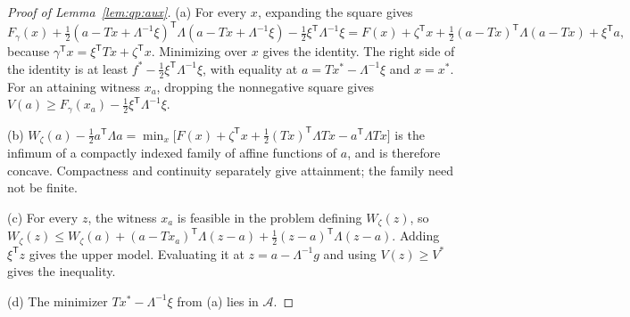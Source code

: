 \begin{proof}[Proof of Lemma~\ref{lem:qp:aux}]
(a) For every $x$, expanding the square gives
\[
 F_\gamma(x)+\tfrac12(a-Tx+\Lambda^{-1}\xi)^{\mathsf T}\Lambda(a-Tx+\Lambda^{-1}\xi)
 -\tfrac12\xi^{\mathsf T}\Lambda^{-1}\xi
 =F(x)+\zeta^{\mathsf T} x+\tfrac12(a-Tx)^{\mathsf T}\Lambda(a-Tx)+\xi^{\mathsf T} a ,
\]
because $\gamma^{\mathsf T} x=\xi^{\mathsf T} Tx+\zeta^{\mathsf T} x$. Minimizing over $x$ gives
the identity. The right side of the identity is at least
$f^*-\frac12\xi^{\mathsf T}\Lambda^{-1}\xi$, with equality at $a=Tx^*-\Lambda^{-1}\xi$
and $x=x^*$. For an attaining witness $x_a$, dropping the nonnegative square
gives $V(a)\ge F_\gamma(x_a)-\frac12\xi^{\mathsf T}\Lambda^{-1}\xi$.

(b) $W_\zeta(a)-\frac12a^{\mathsf T}\Lambda a=\min_x\bigl[F(x)+\zeta^{\mathsf T} x+\frac12(Tx)^{\mathsf T}\Lambda Tx-a^{\mathsf T}\Lambda Tx\bigr]$
is the infimum of a compactly indexed family of affine functions of $a$,
and is therefore concave. Compactness and continuity separately give
attainment; the family need not be finite.

(c) For every $z$, the witness $x_a$ is feasible in the problem defining
$W_\zeta(z)$, so
$W_\zeta(z)\le W_\zeta(a)+(a-Tx_a)^{\mathsf T}\Lambda(z-a)+\frac12(z-a)^{\mathsf T}\Lambda(z-a)$.
Adding $\xi^{\mathsf T} z$ gives the upper model. Evaluating it at
$z=a-\Lambda^{-1}g$ and using $V(z)\ge V^*$ gives the inequality.

(d) The minimizer $Tx^*-\Lambda^{-1}\xi$ from (a) lies in $\mathcal A$.
\end{proof}

